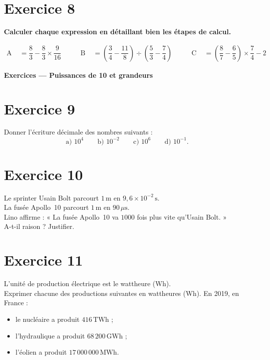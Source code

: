 \documentclass[a4paper,11pt]{article}
\begin{document}
\section*{Exercice 8}
\textbf{Calculer chaque expression en détaillant bien les étapes de calcul.}

\[
\begin{aligned}
\text{A }&= \dfrac{8}{3}-\dfrac{8}{3}\times\dfrac{9}{16}
&\qquad
\text{B }&= \left(\dfrac{3}{4}-\dfrac{11}{8}\right)\div\left(\dfrac{5}{3}-\dfrac{7}{4}\right)
&\qquad
\text{C }&= \left(\dfrac{8}{7}-\dfrac{6}{5}\right)\times\dfrac{7}{4}-2
\end{aligned}
\]

\bigskip
{\Large \textbf{Exercices — Puissances de 10 et grandeurs}}\par\medskip


\section*{Exercice 9}
Donner l’écriture décimale des nombres suivants :
\[
\text{a) }10^{4} \qquad
\text{b) }10^{-2} \qquad
\text{c) }10^{6} \qquad
\text{d) }10^{-1}.
\]

\section*{Exercice 10}
Le sprinter Usain Bolt parcourt \(1\,\text{m}\) en \(9{,}6\times 10^{-2}\,\text{s}\).\\
La fusée Apollo~10 parcourt \(1\,\text{m}\) en \(90\,\mu\text{s}\).\\
Lino affirme : « La fusée Apollo~10 va \(1000\) fois plus vite qu'Usain Bolt. »\\
A-t-il raison ? Justifier.


\section*{Exercice 11}
L’unité de production électrique est le wattheure (Wh).\\
Exprimer chacune des productions suivantes en wattheures (Wh). En 2019, en France :
\begin{itemize}
  \item le nucléaire a produit \(416\,\text{TWh}\) ;
  \item l’hydraulique a produit \(68\,200\,\text{GWh}\) ;
  \item l’éolien a produit \(17\,000\,000\,\text{MWh}\).
\end{itemize}
\end{document}
